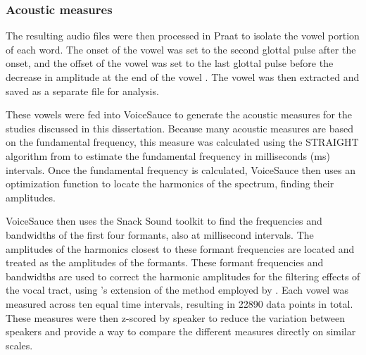\subsubsection{Acoustic measures} \label{sec:acoustics}

The resulting audio files were then processed in Praat to isolate the vowel portion of each word. The onset of the vowel was set to the second glottal pulse after the onset, and the offset of the vowel was set to the last glottal pulse before the decrease in amplitude at the end of the vowel \citep{garellekAcousticDiscriminabilityComplex2020}. The vowel was then extracted and saved as a separate file for analysis.

These vowels were fed into VoiceSauce \citep{shueVoiceSauceProgramVoice2011} to generate the acoustic measures for the studies discussed in this dissertation. Because many acoustic measures are based on the fundamental frequency, this measure was calculated using the STRAIGHT algorithm from \citep{kawaharaInstantaneousfrequencybasedPitchExtraction1998} to estimate the fundamental frequency in milliseconds (ms) intervals. Once the fundamental frequency is calculated, VoiceSauce then uses an optimization function to locate the harmonics of the spectrum, finding their amplitudes.

VoiceSauce then uses the Snack Sound toolkit \citep{sjolanderSnackSoundToolkit2004} to find the frequencies and bandwidths of the first four formants, also at millisecond intervals. The amplitudes of the harmonics closest to these formant frequencies are located and treated as the amplitudes of the formants. These formant frequencies and bandwidths are used to correct the harmonic amplitudes for the filtering effects of the vocal tract, using \citeauthor{iseliAgeSexVowel2007}'s \citeyear{iseliAgeSexVowel2007} extension of the method employed by \citet{hansonGlottalCharacteristicsFemale1997}. Each vowel was measured across ten equal time intervals, resulting in 22890 data points in total. These measures were then z-scored by speaker to reduce the variation between speakers and provide a way to compare the different measures directly on similar scales.

